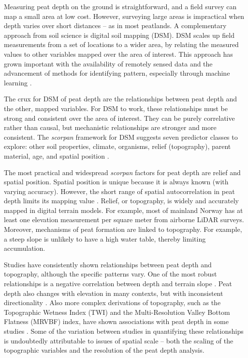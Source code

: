 \documentclass[soil, manuscript]{copernicus}
\begin{document}
Measuring peat depth on the ground is straightforward, and a field survey can map a small area at low cost.
However, surveying large areas is impractical when depth varies over short distances -- as in most peatlands.
A complementary approach from soil science is digital soil mapping (DSM).
DSM scales up field measurements from a set of locations to a wider area, by relating the measured values to other variables mapped over the area of interest.
This approach has grown important with the availability of remotely sensed data and the advancement of methods for identifying pattern, especially through machine learning \citep{minasnyDigitalMappingPeatlands2019, wadouxMachineLearningDigital2020}.

The crux for DSM of peat depth are the relationships between peat depth and the other, mapped variables.
For DSM to work, these relationships must be strong and consistent over the area of interest.
They can be purely correlative rather than causal, but mechanistic relationships are stronger and more consistent.
The \emph{scorpan} framework for DSM suggests seven predictor classes to explore: other soil properties, climate, organisms, relief (topography), parent material, age, and spatial position \citep{mcbratneyDigitalSoilMapping2003}.

The most practical and widespread \emph{scorpan} factors for peat depth are relief and spatial position.
Spatial position is unique because it is always known (with varying accuracy).
However, the short range of spatial autocorrelation in peat depth limits its mapping value \citep{henglGenericFrameworkSpatial2004}.
Relief, or topography, is widely and accurately mapped in digital terrain models.
For example, most of mainland Norway has at least one elevation measurement per square meter from airborne LiDAR surveys.
Moreover, mechanisms of peat formation are linked to topography.
For example, a steep slope is unlikely to have a high water table, thereby limiting accumulation.

Studies have consistently shown relationships between peat depth and topography, although the specific patterns vary.
One of the most robust relationships is a negative correlation between depth and terrain slope \citep[e.g.][]{holdenEstimatingCarbonStock2011, parryMethodModellingPeat2012, gatisMappingUplandPeat2019}.
Peat depth also changes with elevation in many contexts, but with inconsistent directionality \citep[e.g.][]{holdenEstimatingCarbonStock2011, parryMethodModellingPeat2012, rudiyantoDigitalMappingCosteffective2016, rudiyantoOpenDigitalMapping2018, kogantiMappingPeatDepth2023, liFactorsControllingPeat2024}.
Also more complex derivations of topography, such as the Topographic Wetness Index (TWI) and the Multi-Resolution Valley Bottom Flatness (MRVBF) index, have shown associations with peat depth in some studies \citep[e.g.][]{rudiyantoOpenDigitalMapping2018, kogantiMappingPeatDepth2023, liFactorsControllingPeat2024}.
Some of the variation between studies in quantifying these relationships is undoubtedly attributable to issues of spatial scale -- both the scaling of the topographic variables and the resolution of the peat depth analysis.
\end{document}
